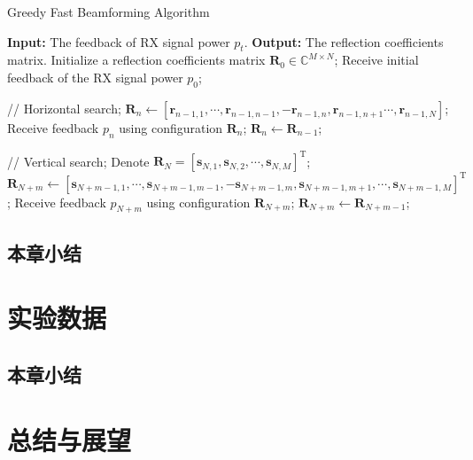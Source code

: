 \documentclass[supercite]{HustGraduPaper}
\begin{document}
\begin{algorithm}
	\caption{Greedy Fast Beamforming Algorithm}
	\label{alg:GreedyAlgorithm}
	\begin{algorithmic}[1]
		\STATE \textbf{Input: } The feedback of RX signal power $p_t$.
		\STATE \textbf{Output: } The reflection coefficients matrix.
		\STATE Initialize a reflection coefficients matrix $ \mathbf{R}_0\in \mathbb{C}^{M \times N }$;
		\STATE Receive initial feedback of the RX signal power $ p_0 $;

		\STATE // Horizontal search;
		\STATE  $ \mathbf{R}_{n} \leftarrow [\mathbf{r}_{n-1,1},\cdots,\mathbf{r}_{n-1,n-1},- \mathbf{r}_{n-1,n}, \mathbf{r}_{n-1,n+1}\cdots,\mathbf{r}_{n-1,N}] $;
		\STATE Receive feedback $ p_{n} $ using configuration $ \mathbf{R}_{n}$;
		\STATE $ \mathbf{R}_{n} \leftarrow \mathbf{R}_{n-1}$;
		\ENDIF
		\ENDFOR

		\STATE // Vertical search;
		\STATE Denote $ \mathbf{R}_{N} =[\mathbf{s}_{N,1},\mathbf{s}_{N,2},\cdots,\mathbf{s}_{N,M}]^\mathrm{T}$;
		\small
		\STATE  $\mathbf{R}_{N+m} \leftarrow [\mathbf{s}_{N+m-1,1},\cdots,\mathbf{s}_{N+m-1,m-1},- \mathbf{s}_{N+m-1,m}, \mathbf{s}_{N+m-1,m+1}, \cdots, \mathbf{s}_{N+m-1,M}]^\mathrm{T}$;
		\normalsize
		\STATE Receive feedback $ p_{N+m} $ using configuration $\mathbf{R}_{N+m}$;
		\STATE $ \mathbf{R}_{N+m} \leftarrow \mathbf{R}_{N+m-1}$;
		\ENDIF
		\ENDFOR
	\end{algorithmic}
\end{algorithm}


\subsection{本章小结}

\section{实验数据}\label{sec:experiment}
\subsection{本章小结}
\section{总结与展望}\label{sec:conclusion}
\end{document}
